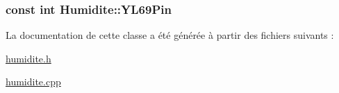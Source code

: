 \subsubsection[{\texorpdfstring{Y\+L69\+Pin}{YL69Pin}}]{\setlength{\rightskip}{0pt plus 5cm}const int Humidite\+::\+Y\+L69\+Pin\hspace{0.3cm}{\ttfamily [private]}}\hypertarget{class_humidite_aec11fda83eec67083d5859c314167c08}{}\label{class_humidite_aec11fda83eec67083d5859c314167c08}


La documentation de cette classe a été générée à partir des fichiers suivants \+:\begin{DoxyCompactItemize}
\item 
\hyperlink{humidite_8h}{humidite.\+h}\item 
\hyperlink{humidite_8cpp}{humidite.\+cpp}\end{DoxyCompactItemize}
